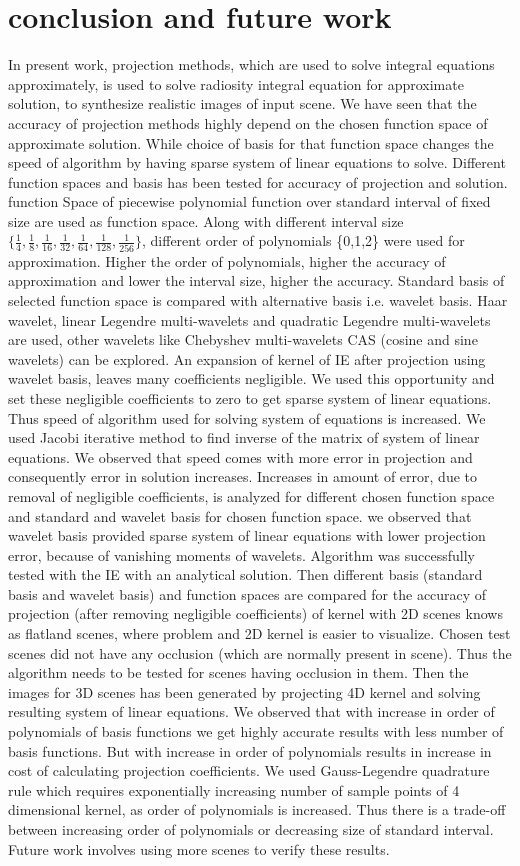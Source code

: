\chapter{conclusion and future work}
In present work, projection methods, which are used to solve integral equations approximately, is used to solve radiosity integral equation for approximate solution, to synthesize realistic images of input scene. We have seen that the accuracy of projection methods highly depend on the chosen function space of approximate solution. While choice of basis for that function space changes the speed of algorithm by having sparse system of linear equations to solve. Different function spaces and basis has been tested for accuracy of projection and solution. function Space of piecewise polynomial function over standard interval of fixed size are used as function space. Along with different interval size $\{\frac{1}{4},\frac{1}{8},\frac{1}{16},\frac{1}{32},\frac{1}{64},\frac{1}{128},\frac{1}{256}\}$, different order of polynomials \{0,1,2\} were used for approximation. Higher the order of polynomials, higher the accuracy of approximation and lower the interval size, higher the accuracy. Standard basis of selected function space is compared with alternative basis i.e. wavelet basis. Haar wavelet, linear Legendre multi-wavelets and quadratic Legendre multi-wavelets are used, other wavelets like Chebyshev multi-wavelets CAS (cosine and sine wavelets) can be explored. An expansion of kernel of IE after projection using wavelet basis, leaves many coefficients negligible. We used this opportunity and set  these negligible coefficients to zero to get sparse system of linear equations. Thus speed of algorithm used for solving system of equations is increased. We used Jacobi iterative method to find inverse of the matrix of system of linear equations. We observed that speed comes with more error in projection and consequently error in solution increases. Increases in amount of error, due to removal of negligible coefficients, is analyzed for different chosen function space and standard and wavelet basis for chosen function space. we observed that wavelet basis provided sparse system of linear equations with lower projection error, because of vanishing moments of wavelets. Algorithm was successfully tested with the IE with an analytical solution. Then different basis (standard basis and wavelet basis) and function spaces are compared for the accuracy of projection (after removing negligible coefficients) of kernel with 2D scenes knows as flatland scenes, where problem and 2D kernel is easier to visualize. Chosen test scenes did not have any occlusion (which are normally present in scene). Thus the algorithm needs to be tested for scenes having occlusion in them. Then the images for 3D scenes has been generated by projecting 4D kernel and solving resulting system of linear equations. We observed that with increase in order of polynomials of basis functions we get highly accurate results with less number of basis functions. But with increase in order of polynomials results in increase in  cost of calculating projection coefficients. We used Gauss-Legendre quadrature rule which requires exponentially increasing number of sample points of 4 dimensional kernel, as order of polynomials is increased. Thus there is a trade-off between increasing order of polynomials or decreasing size of standard interval. Future work involves using more scenes to verify these results.  
